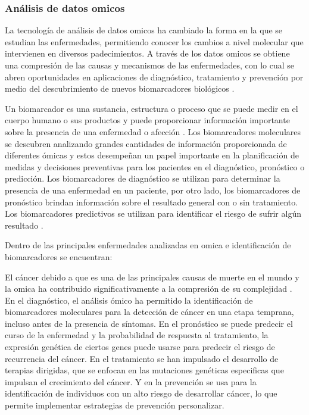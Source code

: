 \subsubsection{Análisis de datos omicos}

La tecnología de análisis de datos omicos ha cambiado la forma en la que se estudian las enfermedades, permitiendo conocer los cambios a nivel molecular que intervienen en diversos padecimientos. A través de los datos omicos se obtiene una compresión de las causas y mecanismos de las enfermedades, con lo cual se abren oportunidades en aplicaciones de diagnóstico, tratamiento y prevención por medio del descubrimiento de nuevos biomarcadores biológicos \citep{reel2021using}.

Un biomarcador es una sustancia, estructura o proceso que se puede medir en el cuerpo humano o sus productos y puede proporcionar información importante sobre la presencia de una enfermedad o afección \citep{strimbu2010biomarkers}. Los biomarcadores moleculares se descubren analizando grandes cantidades de información proporcionada de diferentes ómicas y estos desempeñan un papel importante en la planificación de medidas y decisiones preventivas para los pacientes en el diagnóstico, pronóstico o predicción. Los biomarcadores de diagnóstico se utilizan para determinar la presencia de una enfermedad en un paciente, por otro lado, los biomarcadores de pronóstico brindan información sobre el resultado general con o sin tratamiento. Los biomarcadores predictivos se utilizan para identificar el riesgo de sufrir algún resultado \citep{carlomagno2017diagnostic}.

Dentro de las principales enfermedades analizadas en omica e identificación de biomarcadores se encuentran:

El cáncer debido a que es una de las principales causas de muerte en el mundo y la omica ha contribuido significativamente a la compresión de su complejidad \citep{sarmiento2020aplicaciones}. En el diagnóstico, el análisis ómico ha permitido la identificación de biomarcadores moleculares para la detección de cáncer en una etapa temprana, incluso antes de la presencia de síntomas. En el pronóstico se puede predecir el curso de la enfermedad y la probabilidad de respuesta al tratamiento, la expresión genética de ciertos genes puede usarse para predecir el riesgo de recurrencia del cáncer. En el tratamiento se han impulsado el desarrollo de terapias dirigidas, que se enfocan en las mutaciones genéticas especificas que impulsan el crecimiento del cáncer. Y en la prevención se usa para la identificación de individuos con un alto riesgo de desarrollar cáncer, lo que permite implementar estrategias de prevención personalizar\citep{munir2019cancer}.


